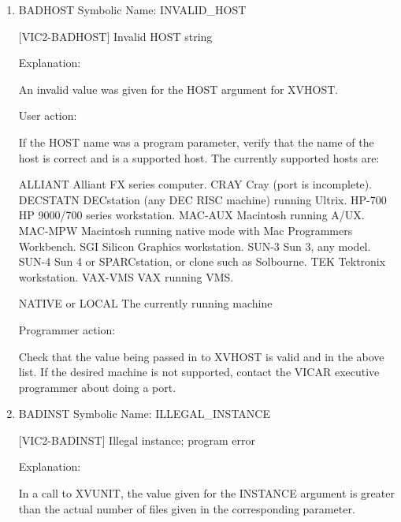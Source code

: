 \begin{enumerate}
 Improper FORMAT string; program error

Explanation:

The pixel format being passed to the indicated routine is not
one of the valid values.  This is a program error.

User action:

Please consult the cognizant programmer to verify that a
valid format string is being passed.

Programmer action:

Make sure that the FORMAT argument to the indicated routine
is one of following values:  BYTE, HALF, FULL, REAL, DOUB, or COMP.


\item BADHOST Symbolic Name: INVALID\_HOST

[VIC2-BADHOST] Invalid HOST string

Explanation:

An invalid value was given for the HOST argument for XVHOST.

User action:

If the HOST name was a program parameter, verify that the name of the
host is correct and is a supported host.  The currently supported hosts
are:

ALLIANT          Alliant FX series computer.
CRAY             Cray (port is incomplete).
DECSTATN         DECstation (any DEC RISC machine) running Ultrix.
HP-700           HP 9000/700 series workstation.
MAC-AUX          Macintosh running A/UX.
MAC-MPW          Macintosh running native mode with Mac Programmers Workbench.
SGI              Silicon Graphics workstation.
SUN-3            Sun 3, any model.
SUN-4            Sun 4 or SPARCstation, or clone such as Solbourne.
TEK              Tektronix workstation.
VAX-VMS          VAX running VMS.

NATIVE or LOCAL  The currently running machine

Programmer action:

Check that the value being passed in to XVHOST is valid and in the
above list.  If the desired machine is not supported, contact the
VICAR executive programmer about doing a port.


\item BADINST Symbolic Name: ILLEGAL\_INSTANCE

[VIC2-BADINST] Illegal instance; program error

Explanation:

In a call to XVUNIT, the value given for the INSTANCE argument
is greater than the actual number of files given in the corresponding
parameter.


\end{enumerate}
